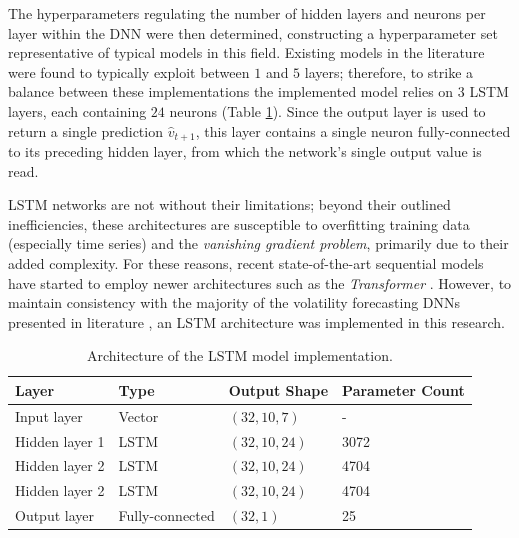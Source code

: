 \documentclass[a4paper, 11pt]{report}
\begin{document}
    The hyperparameters regulating the number of hidden layers and neurons per layer within the DNN were then determined, constructing a hyperparameter set representative of typical models in this field. Existing models in the literature were found to typically exploit between $1$ \citep{bucci-2020} and $5$ \citep{kim-2018} layers; therefore, to strike a balance between these implementations the implemented model relies on $3$ LSTM layers, each containing $24$ neurons (Table \ref{table: architecture}). Since the output layer is used to return a single prediction $\hat{v}_{t+1}$, this layer contains a single neuron fully-connected to its preceding hidden layer, from which the network's single output value is read.

    LSTM networks are not without their limitations; beyond their outlined inefficiencies, these architectures are susceptible to overfitting training data (especially time series) and the \emph{vanishing gradient problem}, primarily due to their added complexity. For these reasons, recent state-of-the-art sequential models have started to employ newer architectures such as the \emph{Transformer} \citep{vaswani-2017}. However, to maintain consistency with the majority of the volatility forecasting DNNs presented in literature \citep{ge-2022}, an LSTM architecture was implemented in this research.


    \begin{table}[ht]
        \centering
        \begin{tabular}{|l|l|l|l|} 
        \hline
        \textbf{\footnotesize Layer} & \textbf{\footnotesize Type} & \textbf{\footnotesize Output Shape}   & \textbf{\footnotesize Parameter Count}  \\ 
        \hline
        Input layer    & Vector        & $(32, 10, 7)$  & -                         \\ 
        \hline
        Hidden layer 1 & LSTM          & $(32, 10, 24)$ & 3072                      \\ 
        \hline
        Hidden layer 2 & LSTM          & $(32, 10, 24)$ & 4704                      \\ 
        \hline
        Hidden layer 2 & LSTM          & $(32, 10, 24)$ & 4704                      \\ 
        \hline
        Output layer   & Fully-connected           & $(32, 1)$      & 25                        \\
        \hline
        \end{tabular}
        \caption{\centering Architecture of the LSTM model implementation.}
        \label{table: architecture}
    \end{table}
\end{document}
